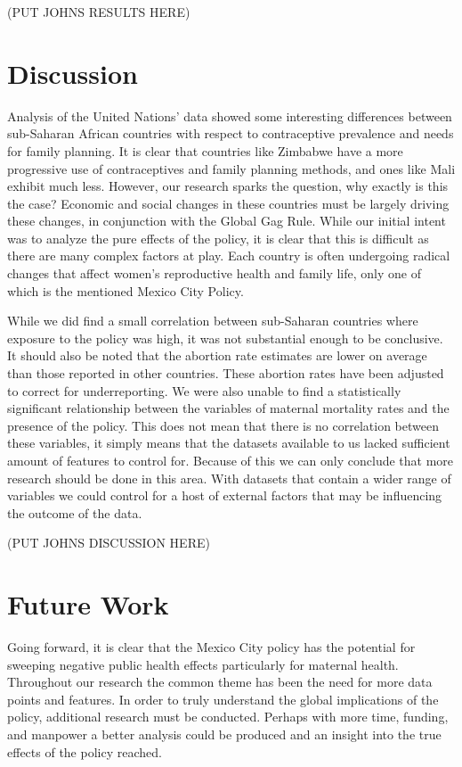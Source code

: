 \documentclass[11pt,]{article}
\begin{document}
(PUT JOHNS RESULTS HERE)

\section{Discussion}\label{discussion}

Analysis of the United Nations' data showed some interesting differences
between sub-Saharan African countries with respect to contraceptive
prevalence and needs for family planning. It is clear that countries
like Zimbabwe have a more progressive use of contraceptives and family
planning methods, and ones like Mali exhibit much less. However, our
research sparks the question, why exactly is this the case? Economic and
social changes in these countries must be largely driving these changes,
in conjunction with the Global Gag Rule. While our initial intent was to
analyze the pure effects of the policy, it is clear that this is
difficult as there are many complex factors at play. Each country is
often undergoing radical changes that affect women's reproductive health
and family life, only one of which is the mentioned Mexico City Policy.

While we did find a small correlation between sub-Saharan countries
where exposure to the policy was high, it was not substantial enough to
be conclusive. It should also be noted that the abortion rate estimates
are lower on average than those reported in other countries. These
abortion rates have been adjusted to correct for underreporting. We were
also unable to find a statistically significant relationship between the
variables of maternal mortality rates and the presence of the policy.
This does not mean that there is no correlation between these variables,
it simply means that the datasets available to us lacked sufficient
amount of features to control for. Because of this we can only conclude
that more research should be done in this area. With datasets that
contain a wider range of variables we could control for a host of
external factors that may be influencing the outcome of the data.

(PUT JOHNS DISCUSSION HERE)

\section{Future Work}\label{future-work}

Going forward, it is clear that the Mexico City policy has the potential
for sweeping negative public health effects particularly for maternal
health. Throughout our research the common theme has been the need for
more data points and features. In order to truly understand the global
implications of the policy, additional research must be conducted.
Perhaps with more time, funding, and manpower a better analysis could be
produced and an insight into the true effects of the policy reached.

\newpage
\singlespacing 
\end{document}
